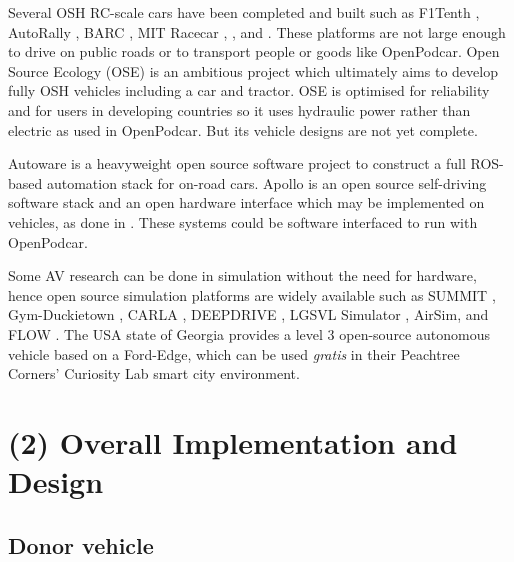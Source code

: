 \documentclass[a4paper]{article}
\begin{document}
	Several OSH RC-scale cars have been completed and built such as F1Tenth \cite{f1tenth}, AutoRally \cite{goldfain2019autorally}, BARC \cite{gonzales2018planning}, MIT Racecar \cite{mit}, \cite{nakamoto2019development}, and \cite{vincke2021open}. These platforms are not large enough to drive on public roads or to transport people or goods like OpenPodcar. Open Source Ecology (OSE) \cite{jakubowski2003open} is an ambitious project which ultimately aims to develop fully OSH vehicles including a car and tractor. OSE is optimised for reliability and for users in developing countries so it uses hydraulic power rather than electric as used in OpenPodcar. But its vehicle designs are not yet complete.
	
	Autoware \cite{kato2018autoware} is a heavyweight open source software project to construct a full ROS-based automation stack for on-road cars. Apollo \cite{apolloautoapollo} is an open source self-driving software stack and an open hardware interface which may be implemented on vehicles, as done in \cite{kessler2019bridging}. These systems could be software interfaced to run with OpenPodcar. 
	
	Some AV research can be done in simulation without the need for hardware, hence open source simulation platforms are widely available such as SUMMIT \cite{cai2020summit}, Gym-Duckietown \cite{chevalier-boisvert2018duckietown}, CARLA \cite{dosovitskiy2017carla}, DEEPDRIVE \cite{quiterdeepdrive}, LGSVL Simulator \cite{rong2020lgsvl}, AirSim\cite{shah2017airsim}, and FLOW \cite{wu2017flow}. The USA state of Georgia provides a level 3 open-source autonomous vehicle based on a Ford-Edge\cite{peachtreecuriosity}, which can be used {\em gratis} in their Peachtree Corners' Curiosity Lab smart city environment.
	
	\section{(2) Overall Implementation and Design}\label{h.1u7vph94gfbt}
	
	\subsection{Donor vehicle}
	
\end{document}
